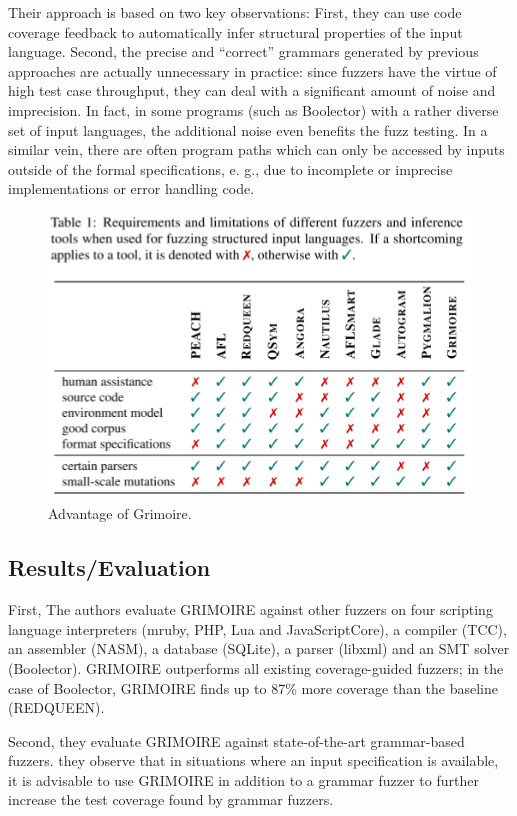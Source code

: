  Their approach is based on two key observations: First, they can use code coverage feedback to automatically infer structural properties of the input language. Second, the precise and “correct” grammars generated by previous approaches are actually unnecessary in practice: since fuzzers have the virtue of high test case throughput, they can deal with a significant amount of noise and imprecision. In fact, in some programs (such as Boolector) with a rather diverse set of input languages, the additional noise even benefits the fuzz testing. In a similar vein, there are often program paths which can only be accessed by inputs outside of the formal specifications, e. g., due to incomplete or imprecise implementations or error handling code.
\begin{figure}[h]
    \centering
    \includegraphics[width=\linewidth]{grimoire.png} %
    \caption{Advantage of Grimoire.}	
    \label{fig:janus}
\end{figure}
\subsection{Results/Evaluation}
 First, The authors evaluate GRIMOIRE against other fuzzers on four scripting language interpreters (mruby, PHP, Lua and JavaScriptCore), a compiler (TCC), an assembler (NASM), a database (SQLite), a parser (libxml) and an SMT solver (Boolector).  GRIMOIRE outperforms all existing coverage-guided fuzzers; in the case of Boolector, GRIMOIRE finds up to 87\% more coverage than the baseline (REDQUEEN). 

 Second, they evaluate GRIMOIRE against state-of-the-art grammar-based fuzzers. they observe that in situations where an input specification is available, it is advisable to use GRIMOIRE in addition to a grammar fuzzer to further increase the test coverage found by grammar fuzzers.
 
